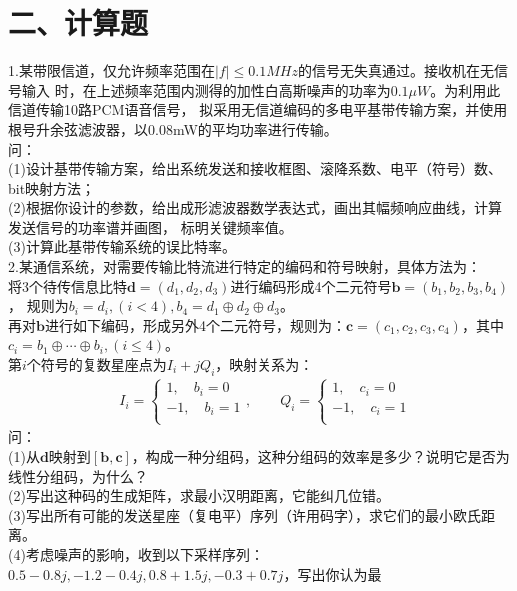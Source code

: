 \documentclass[UTF8]{ctexart}
\begin{document}
\section*{二、计算题}
1.某带限信道，仅允许频率范围在$\lvert f\rvert\leq0.1MHz$的信号无失真通过。接收机在无信号输入
时，在上述频率范围内测得的加性白高斯噪声的功率为$0.1\mu W$。为利用此信道传输10路PCM语音信号，
拟采用无信道编码的多电平基带传输方案，并使用根号升余弦滤波器，以0.08mW的平均功率进行传输。\\
问：\\
(1)设计基带传输方案，给出系统发送和接收框图、滚降系数、电平（符号）数、bit映射方法；\\
(2)根据你设计的参数，给出成形滤波器数学表达式，画出其幅频响应曲线，计算发送信号的功率谱并画图，
标明关键频率值。\\
(3)计算此基带传输系统的误比特率。\\
2.某通信系统，对需要传输比特流进行特定的编码和符号映射，具体方法为：\\
将3个待传信息比特$\bm{d}=(d_1,d_2,d_3)$进行编码形成4个二元符号$\bm{b}=(b_1,b_2,b_3,b_4)$，
规则为$b_i=d_i,(i<4),b_4=d_1\oplus d_2\oplus d_3$。\\
再对$\bm{b}$进行如下编码，形成另外4个二元符号，规则为：$\bm{c}=(c_1,c_2,c_3,c_4)$，其中$c_i
  =b_1\oplus\cdots\oplus b_i,(i\leq 4)$。\\
第$i$个符号的复数星座点为$I_i+jQ_i$，映射关系为：
\begin{equation*}
  \begin{aligned}
     & I_i=\begin{cases}
      1,\quad b_i=0  \\
      -1,\quad b_i=1 \\
    \end{cases},\quad\quad
    Q_i=\begin{cases}
      1,\quad c_i=0  \\
      -1,\quad c_i=1 \\
    \end{cases}
  \end{aligned}
\end{equation*}
问：\\
(1)从$\bm{d}$映射到$[\bm{b},\bm{c}]$，构成一种分组码，这种分组码的效率是多少？说明它是否为
线性分组码，为什么？\\
(2)写出这种码的生成矩阵，求最小汉明距离，它能纠几位错。\\
(3)写出所有可能的发送星座（复电平）序列（许用码字），求它们的最小欧氏距离。\\
(4)考虑噪声的影响，收到以下采样序列：$0.5-0.8j,-1.2-0.4j,0.8+1.5j,-0.3+0.7j$，写出你认为最
\end{document}
